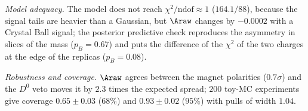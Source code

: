 \emph{Model adequacy.} The model does not reach $\chi^2/\mathrm{ndof}\approx1$ ($164.1/88$), because the signal tails are heavier than a Gaussian, but $\Araw$ changes by $-0.0002$ with a Crystal Ball signal; the posterior predictive check reproduces the asymmetry in slices of the mass ($p_B=0.67$) and puts the difference of the $\chi^2$ of the two charges at the edge of the replicas ($p_B=0.08$).

\emph{Robustness and coverage.} $\Araw$ agrees between the magnet polarities ($0.7\sigma$) and the $D^0$ veto moves it by $2.3$ times the expected spread; $200$ toy-MC experiments give coverage $0.65\pm0.03$ ($68\%$) and $0.93\pm0.02$ ($95\%$) with pulls of width $1.04$.
